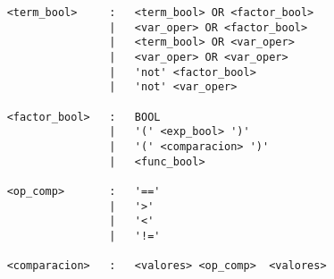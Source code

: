 \begin{verbatim}
    <term_bool>     :   <term_bool> OR <factor_bool>
                    |   <var_oper> OR <factor_bool>
                    |   <term_bool> OR <var_oper>
                    |   <var_oper> OR <var_oper>
                    |   'not' <factor_bool>
                    |   'not' <var_oper>

    <factor_bool>   :   BOOL
                    |   '(' <exp_bool> ')'
                    |   '(' <comparacion> ')'
                    |   <func_bool>

    <op_comp>       :   '=='
                    |   '>'
                    |   '<'
                    |   '!='

    <comparacion>   :   <valores> <op_comp>  <valores>

    
\end{verbatim}

